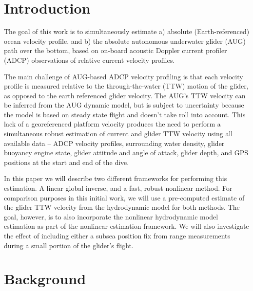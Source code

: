 \section{Introduction}

The goal of this work is to simultaneously estimate a) absolute (Earth-referenced) ocean velocity profile, and b) the absolute autonomous underwater glider (AUG) path over the bottom, based on on-board acoustic Doppler current profiler (ADCP) observations of relative current velocity profiles. 

The main challenge of AUG-based ADCP velocity profiling is that each velocity profile is measured relative to the through-the-water (TTW) motion of the glider, as opposed to the earth referenced glider velocity. The AUG's TTW velocity can be inferred from the AUG dynamic model, but is subject to uncertainty because the model is based on steady state flight and doesn't take roll into account. This lack of a georeferenced platform velocity produces the need to perform a simultaneous robust estimation of current and glider TTW velocity using all available data -- ADCP velocity profiles, surrounding water density, glider buoyancy engine state, glider attitude and angle of attack, glider depth, and GPS positions at the start and end of the dive.

In this paper we will describe two different frameworks for performing this estimation. A linear global inverse, and a fast, robust nonlinear method. For comparison purposes in this initial work, we will use a pre-computed estimate of the glider TTW velocity from the hydrodynamic model for both methods. The goal, however, is to also incorporate the nonlinear hydrodynamic model estimation as part of the nonlinear estimation framework. We will also investigate the effect of including either a subsea position fix from range measurements during a small portion of the glider's flight.

\section{Background}


